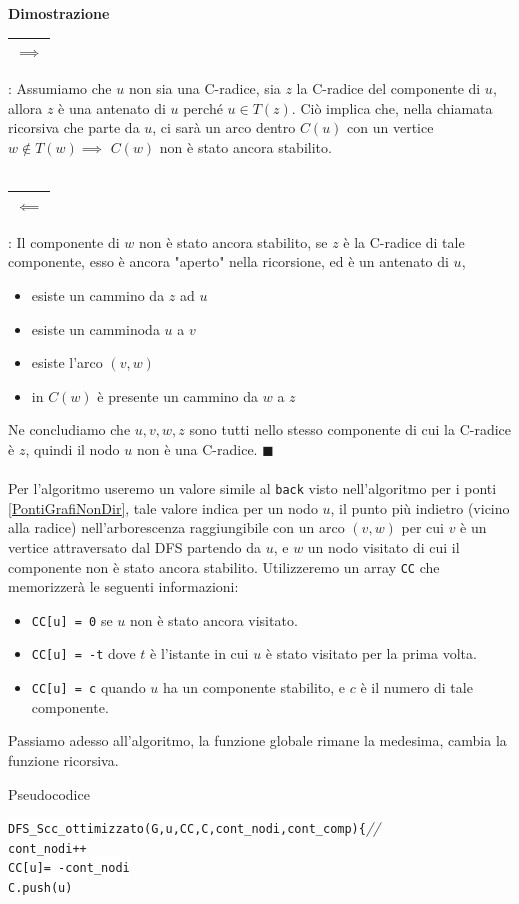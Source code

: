 \documentclass[12pt, letterpaper]{article}
\newcommand{\code}[1]{\colorbox{light-gray}{\texttt{#1}}}
\newcommand{\codee}[1]{\colorbox{white}{\texttt{#1}}}
\newcommand{\acc}{\\\hphantom{}\\}
\newcommand{\comm}[1]{\color{lg}\textit{\hphantom{spaz}// \text{#1}}\color{black}}
\newcommand{\boxedMath}[1]{\begin{tabular}{|c|}\hline \texttt{#1} \\ \hline\end{tabular} :}
\begin{document}
\textbf{Dimostrazione} \boxedMath{$\implies$} Assumiamo che $u$ non sia una C-radice, sia $z$ la C-radice del componente
di $u$, allora $z$ è una antenato di $u$ perché $u\in T(z)$. Ciò implica che, nella chiamata ricorsiva che parte da $u$,
ci sarà un arco dentro $C(u)$ con un vertice $w\notin T(w)\implies$ $ C(w)$ non è stato ancora stabilito.
\acc\boxedMath{$\impliedby$} Il componente di $w$ non è stato ancora stabilito, se $z$ è la C-radice di tale componente, esso
è ancora "aperto" nella ricorsione, ed è un antenato di $u$, \begin{itemize}
    \item esiste un cammino da $z$ ad $u$
    \item esiste un camminoda $u$ a $v$
    \item esiste l'arco $(v,w)$
    \item in $C(w)$ è presente un cammino da $w$ a $z$
\end{itemize}
Ne concludiamo che $u,v,w,z$ sono tutti nello stesso componente di cui la C-radice è $z$, quindi il nodo $u$
non è una C-radice. $\blacksquare$\acc
Per l'algoritmo useremo un valore simile al \code{back} visto nell'algoritmo per i ponti \ref{PontiGrafiNonDir}, tale
valore indica per un nodo $u$, il punto più indietro (vicino alla radice) nell'arborescenza raggiungibile con un
arco $(v,w)$ per cui $v$ è un vertice attraversato dal DFS partendo da $u$, e $w$ un nodo visitato di cui
il componente non è stato ancora stabilito. Utilizzeremo un array \code{CC} che memorizzerà le seguenti informazioni:\begin{itemize}
    \item \code{CC[u] = 0} se $u$ non è stato ancora visitato.
    \item \code{CC[u] = -t} dove $t$ è l'istante in cui $u$ è stato visitato per la prima volta.
    \item \code{CC[u] = c} quando $u$ ha un componente stabilito, e $c$ è il numero di tale componente.
\end{itemize}
Passiamo adesso all'algoritmo, la funzione globale rimane la medesima, cambia la funzione ricorsiva.
\begin{center}
    Pseudocodice
\end{center}
\codee{DFS\_Scc\_ottimizzato(G,u,CC,C,cont\_nodi,cont\_comp)\{}\comm{funzione ricorsiva}\\
\hphantom{ident}\codee{cont\_nodi++}\\
\hphantom{ident}\codee{CC[u]= -cont\_nodi}\\
\hphantom{ident}\codee{C.push(u)}\\
\end{document}

